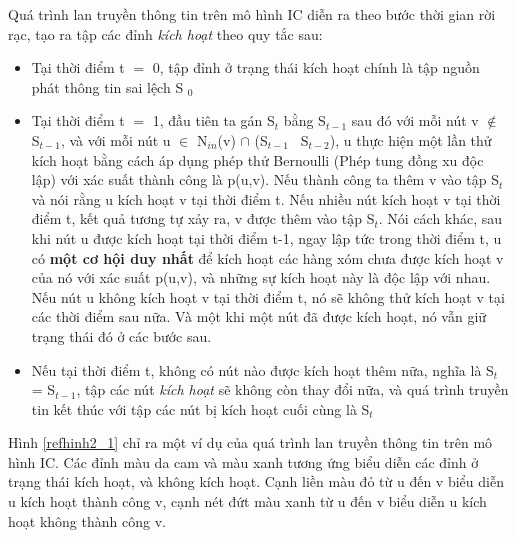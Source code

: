 	Quá trình lan truyền thông tin trên mô hình IC diễn ra theo bước thời gian rời rạc, tạo ra tập các đỉnh {\itshape kích hoạt} theo quy tắc sau:
	\begin {itemize}
		\item Tại thời điểm t $=$ 0, tập đỉnh ở trạng thái kích hoạt chính là tập nguồn phát thông tin sai lệch S $_{0}$
	
		\item Tại thời điểm t $=$ 1, đầu tiên ta gán S$_{t}$ bằng S$_{t-1}$ sau đó với mỗi nút v $\notin$ S$_{t-1}$, và với mỗi nút u $\in$ N$_{in}$(v) $\cap$ (S$_{t-1}$ \ S$_{t-2}$), u thực hiện một lần thử kích hoạt bằng cách áp dụng phép thử Bernoulli (Phép tung đồng xu độc lập) với xác suất thành công là p(u,v). Nếu thành công ta thêm v vào tập S$_{t}$ và nói rằng u kích hoạt v tại thời điểm t. Nếu nhiều nút kích hoạt v tại thời điểm t, kết quả tương tự xảy ra, v được thêm vào tập S$_{t}$. Nói cách khác, sau khi nút u được kích hoạt tại thời điểm t-1, ngay lập tức trong thời điểm t, u có {\bfseries một cơ hội duy nhất} để kích hoạt các hàng xóm chưa được kích hoạt v của nó với xác suất p(u,v), và những sự kích hoạt này là độc lập với nhau. Nếu nút u không kích hoạt v tại thời điểm t, nó sẽ không thử kích hoạt v tại các thời điểm sau nữa. Và một khi một nút đã được kích hoạt, nó vẫn giữ trạng thái đó ở các bước sau.
		
		\item Nếu tại thời điểm t, không có nút nào được kích hoạt thêm nữa, nghĩa là S$_{t}$ = S$_{t-1}$, tập các nút {\itshape kích hoạt} sẽ không còn thay đổi nữa, và quá trình truyền tin kết thúc với tập các nút bị kích hoạt cuối cùng là S$_{t}$
	\end {itemize}
	Hình \ref{refhinh2_1} chỉ ra một ví dụ của quá trình lan truyền thông tin trên mô hình IC. Các đỉnh màu da cam và màu xanh tương ứng biểu diễn các đỉnh ở trạng thái kích hoạt, và không kích hoạt. Cạnh liền màu đỏ từ u đến v biểu diễn u kích hoạt thành công v, cạnh nét đứt màu xanh từ u đến v biểu diễn u kích hoạt không thành công v.
